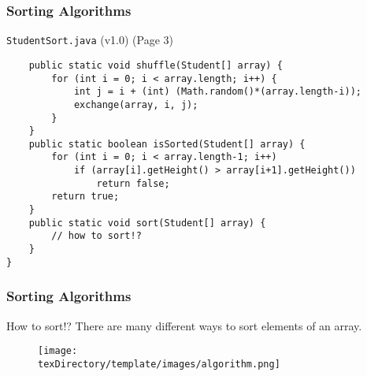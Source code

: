 \documentclass[10pt, compress]{beamer}
\begin{document}
\begin{frame}[fragile]
	\frametitle{Sorting Algorithms}
	\begin{block}{\texttt{StudentSort.java} (v1.0) (Page 3)}
		\begin{verbatim}
	public static void shuffle(Student[] array) {
		for (int i = 0; i < array.length; i++) {
			int j = i + (int) (Math.random()*(array.length-i));
			exchange(array, i, j);
		}
	}
	public static boolean isSorted(Student[] array) {
		for (int i = 0; i < array.length-1; i++)
			if (array[i].getHeight() > array[i+1].getHeight())
				return false;
		return true;
	}
	public static void sort(Student[] array) {
		// how to sort!?
	}
}
		\end{verbatim}
	\end{block}
\end{frame}

\begin{frame}[fragile]
	\frametitle{Sorting Algorithms}
	\begin{block}{How to sort!?}
	There are many different ways to sort elements of an array.
		\begin{figure}
			\texttt{[image: \\texDirectory/template/images/algorithm.png]}
		\end{figure}
	\end{block}
\end{frame}
\end{document}
